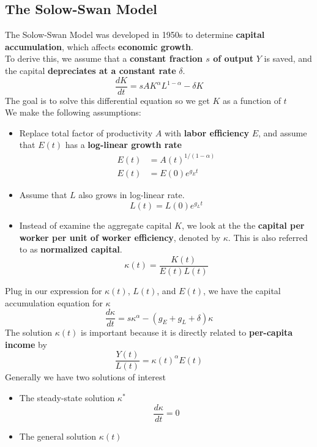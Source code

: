 \documentclass[a4paper]{article}
\begin{document}
\subsection{The Solow-Swan Model}
The Solow-Swan Model was developed in 1950s to determine \textbf{capital accumulation}, which affects \textbf{economic growth}. \smallskip \\
To derive this, we assume that a \textbf{constant fraction $s$ of output} $Y$ is saved, and the capital \textbf{depreciates at a constant rate} $\delta$.
\begin{equation}
    \tag{Capital Accumulation Equation}
    \frac{dK}{dt} = sAK^{\alpha}L^{1-\alpha} - \delta K
\end{equation}
The goal is to solve this differential equation so we get $K$ as a function of $t$ \smallskip \\
We make the following assumptions: \begin{itemize}
    \item Replace total factor of productivity $A$ with \textbf{labor efficiency} $E$, and assume that $E(t)$ has a \textbf{log-linear growth rate}
    \begin{align*}
        E(t) &= A(t)^{1/(1-\alpha)} \\
        E(t) &= E(0)e^{g_E t}
    \end{align*}
    \item Assume that $L$ also grows in log-linear rate.
    \[ L(t) = L(0)e^{g_L t} \]
    \item Instead of examine the aggregate capital $K$, we look at the the \textbf{capital per worker per unit of worker efficiency}, denoted by $\kappa$. This 
    is also referred to as \textbf{normalized capital}.
    \[ \kappa(t) = \frac{K(t)}{E(t)L(t)} \]
\end{itemize}
Plug in our expression for $\kappa(t)$, $L(t)$, and $E(t)$, we have the capital accumulation equation for $\kappa$
\[ \frac{d\kappa}{dt} = s\kappa^\alpha - (g_E + g_L + \delta)\kappa \]
The solution $\kappa(t)$ is important because it is directly related to \textbf{per-capita income} by
\[ \frac{Y(t)}{L(t)} = \kappa(t)^\alpha E(t) \]
% 
Generally we have two solutions of interest
\begin{itemize}
    \item The steady-state solution $\kappa^*$
    \[ \frac{d\kappa}{dt} = 0 \]
    \item The general solution $\kappa(t)$
\end{itemize}

\pagebreak
\end{document}
